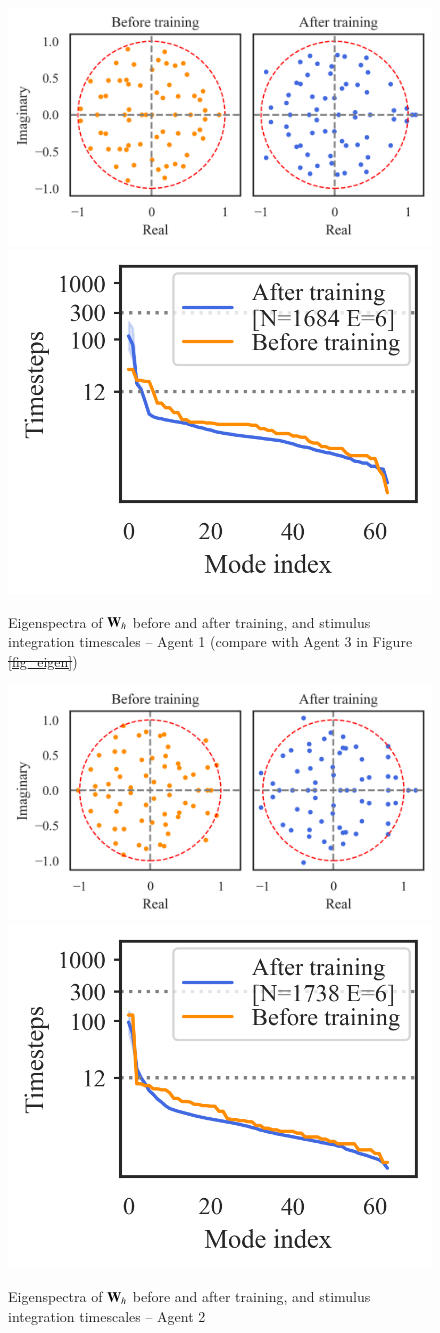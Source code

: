 \documentclass[5p,twocolumn,authoryear]{elsarticle}
\providecommand{\DIFaddtex}[1]{{\protect\color{blue}\uwave{#1}}} %
\providecommand{\DIFdeltex}[1]{{\protect\color{red}\sout{#1}}}                      %
\providecommand{\DIFaddFL}[1]{\DIFadd{#1}} %
\providecommand{\DIFdelFL}[1]{\DIFdel{#1}} %
\providecommand{\DIFaddbeginFL}{} %
\providecommand{\DIFaddendFL}{} %
\providecommand{\DIFdelbeginFL}{} %
\providecommand{\DIFdelendFL}{} %
\providecommand{\DIFadd}[1]{\texorpdfstring{\DIFaddtex{#1}}{#1}} %
\providecommand{\DIFdel}[1]{\texorpdfstring{\DIFdeltex{#1}}{}} %
\newcommand{\DIFscaledelfig}{0.5}
\newlength{\DIFdelgraphicswidth} %
\newlength{\DIFdelgraphicsheight} %
\newcommand{\DIFaddincludegraphics}[2][]{{\color{blue}\fbox{\DIFOincludegraphics[#1]{#2}}}} %
\newcommand{\DIFdelincludegraphics}[2][]{%
\sbox{\DIFdelgraphicsbox}{\DIFOincludegraphics[#1]{#2}}%
\settoboxwidth{\DIFdelgraphicswidth}{\DIFdelgraphicsbox} %
\settoboxtotalheight{\DIFdelgraphicsheight}{\DIFdelgraphicsbox} %
\scalebox{\DIFscaledelfig}{%
\parbox[b]{\DIFdelgraphicswidth}{\usebox{\DIFdelgraphicsbox}\\[-\baselineskip] \rule{\DIFdelgraphicswidth}{0em}}\llap{\resizebox{\DIFdelgraphicswidth}{\DIFdelgraphicsheight}{%
\setlength{\unitlength}{\DIFdelgraphicswidth}%
\begin{picture}(1,1)%
\thicklines\linethickness{2pt} %
{\color[rgb]{1,0,0}\put(0,0){\framebox(1,1){}}}%
{\color[rgb]{1,0,0}\put(0,0){\line( 1,1){1}}}%
{\color[rgb]{1,0,0}\put(0,1){\line(1,-1){1}}}%
\end{picture}%
}\hspace*{3pt}}} %
} %
\DeclareRobustCommand{\DIFaddbeginFL}{\DIFOaddbeginFL \let\includegraphics\DIFaddincludegraphics} %
\DeclareRobustCommand{\DIFaddendFL}{\DIFOaddendFL \let\includegraphics\DIFOincludegraphics} %
\DeclareRobustCommand{\DIFdelbeginFL}{\DIFOdelbeginFL \let\includegraphics\DIFdelincludegraphics} %
\DeclareRobustCommand{\DIFdelendFL}{\DIFOaddendFL \let\includegraphics\DIFOincludegraphics} %
\begin{document}
\begin{figure}[h!]
\centering
\includegraphics[width=0.45\linewidth]{eigenspectra_2760377.png}
\includegraphics[width=0.27\linewidth]{timescales_2760377.png}
\caption[Eigenspectra of $\bW_h$ before and after training, and stimulus integration timescales -- Agent 1]{Eigenspectra of $\bW_h$ before and after training, and stimulus integration timescales -- Agent 1 (compare with Agent 3 in Figure \DIFdelbeginFL \DIFdelFL{\ref{fig_eigen}}\DIFdelendFL \DIFaddbeginFL \DIFaddFL{\ref{fig_eigen_mlps}}\DIFaddendFL )}
\end{figure}

\begin{figure}[h!]
\centering
\includegraphics[width=0.45\linewidth]{eigenspectra_3199993.png}
\includegraphics[width=0.27\linewidth]{timescales_3199993.png}
\caption{Eigenspectra of $\bW_h$ before and after training, and stimulus integration timescales -- Agent 2}
\end{figure}
\end{document}
